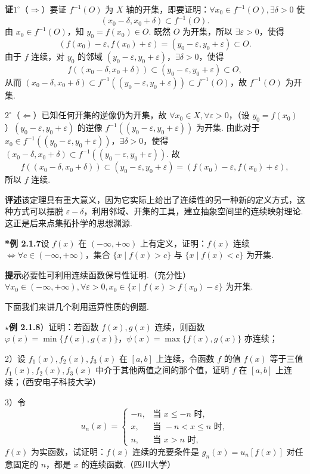\documentclass[UTF8, 12pt, fontset=fandol, oneside]{ctexart}
\begin{document}
\noindent\textbf{证}\quad $1^\circ$（$\Rightarrow$）要证 $f^{-1}(O)$ 为 $X$ 轴的开集，即要证明：$\forall x_0\in f^{-1}(O),\exists\delta>0$ 使
\[
  (x_0-\delta,x_0+\delta)\subset f^{-1}(O).
\tag{1}
\]
由 $x_0\in f^{-1}(O)$，知 $y_0=f(x_0)\in O$. 既然 $O$ 为开集，所以 $\exists\varepsilon>0$，使得
\[
  (f(x_0)-\varepsilon,f(x_0)+\varepsilon)=(y_0-\varepsilon,y_0+\varepsilon)\subset O.
\tag{2}
\]
由于 $f$ 连续，对 $y_0$ 的邻域 $(y_0-\varepsilon,y_0+\varepsilon)$，$\exists\delta>0$，使得
\[
  f((x_0-\delta,x_0+\delta))\subset (y_0-\varepsilon,y_0+\varepsilon)\subset O,
\]
从而 $(x_0-\delta,x_0+\delta)\subset f^{-1}((y_0-\varepsilon,y_0+\varepsilon))\subset f^{-1}(O)$，故 $f^{-1}(O)$ 为开集.

$2^\circ$（$\Leftarrow$）已知任何开集的逆像仍为开集，故 $\forall x_0\in X,\forall\varepsilon>0$，（设 $y_0=f(x_0)$）$(y_0-\varepsilon,y_0+\varepsilon)$ 的逆像 $f^{-1}((y_0-\varepsilon,y_0+\varepsilon))$ 为开集. 由此对于 $x_0\in f^{-1}((y_0-\varepsilon,y_0+\varepsilon))$，$\exists\delta>0$，使得 $(x_0-\delta,x_0+\delta)\subset f^{-1}((y_0-\varepsilon,y_0+\varepsilon))$. 故
\[
  f((x_0-\delta,x_0+\delta))\subset (y_0-\varepsilon,y_0+\varepsilon)=(f(x_0)-\varepsilon,f(x_0)+\varepsilon),
\]
所以 $f$ 连续.

\noindent\textbf{评述}\quad 该定理具有重大意义，因为它实际上给出了连续性的另一种新的定义方式，这种方式可以摆脱 $\varepsilon-\delta$，利用邻域、开集的工具，建立抽象空间里的连续映射理论. 这正是后来点集拓扑学的思想渊源.

\noindent\textbf{*例 2.1.7}\quad 设 $f(x)$ 在 $(-\infty,+\infty)$ 上有定义，证明：$f(x)$ 连续 $\Leftrightarrow \forall c\in(-\infty,+\infty)$，集合 $\{x\mid f(x)>c\}$ 与 $\{x\mid f(x)<c\}$ 为开集.

\noindent\textbf{提示}\quad 必要性可利用连续函数保号性证明.（充分性）$\forall x_0\in(-\infty,+\infty),\forall\varepsilon>0,x_0\in\{x\mid f(x)>f(x_0)-\varepsilon\}$ 为开集.

下面我们来讲几个利用运算性质的例题.

\noindent\textbf{$\star$例 2.1.8}）证明：若函数 $f(x),g(x)$ 连续，则函数 $\varphi(x)=\min\{f(x),g(x)\}$，$\psi(x)=\max\{f(x),g(x)\}$ 亦连续；

2）设 $f_1(x),f_2(x),f_3(x)$ 在 $[a,b]$ 上连续，令函数 $f$ 的值 $f(x)$ 等于三值 $f_1(x),f_2(x),f_3(x)$ 中介于其他两值之间的那个值，证明 $f$ 在 $[a,b]$ 上连续；（西安电子科技大学）

3）令
\[
  u_n(x)=
  \begin{cases}
    -n, & \text{当 }x\le -n\text{ 时},\\
    x, & \text{当 }-n<x\le n\text{ 时},\\
    n, & \text{当 }x>n\text{ 时},
  \end{cases}
\]
$f(x)$ 为实函数，试证明：$f(x)$ 连续的充要条件是 $g_n(x)=u_n[f(x)]$ 对任意固定的 $n$，都是 $x$ 的连续函数.（四川大学）
\end{document}

